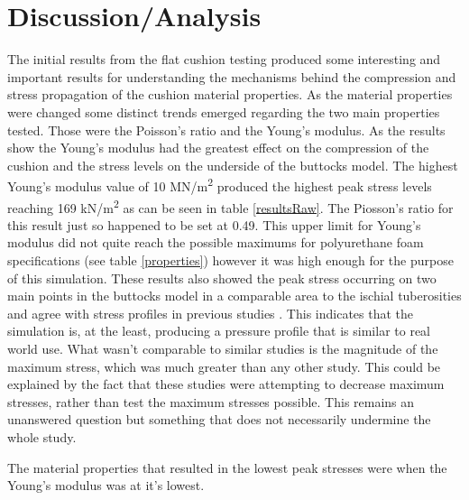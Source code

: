 \documentclass[conference]{IEEEtran}
\begin{document}
\section{Discussion/Analysis}
The initial results from the flat cushion testing produced some interesting and important results for understanding the mechanisms behind the compression and stress propagation of the cushion material properties. As the material properties were changed some distinct trends emerged regarding the two main properties tested. Those were the Poisson's ratio and the Young's modulus. As the results show the Young's modulus had the greatest effect on the compression of the cushion and the stress levels on the underside of the buttocks model. The highest Young's modulus value of 10 MN/m\textsuperscript{2} produced the highest peak stress levels reaching 169 kN/m\textsuperscript{2} as can be seen in table \ref{resultsRaw}. The Piosson's ratio for this result just so happened to be set at 0.49. This upper limit for Young's modulus did not quite reach the possible maximums for polyurethane foam specifications (see table \ref{properties}) however it was high enough for the purpose of this simulation. These results also showed the peak stress occurring on two main points in the buttocks model in a comparable area to the ischial tuberosities and agree with stress profiles in previous studies \cite{HermanMiller2013,Nigel2002}. This indicates that the simulation is, at the least, producing a pressure profile that is similar to real world use. What wasn't comparable to similar studies is the magnitude of the maximum stress, which was much greater than any other study. This could be explained by the fact that these studies were attempting to decrease maximum stresses, rather than test the maximum stresses possible. This remains an unanswered question but something that does not necessarily undermine the whole study.


The material properties that resulted in the lowest peak stresses were when the Young's modulus was at it's lowest. 
\end{document}
